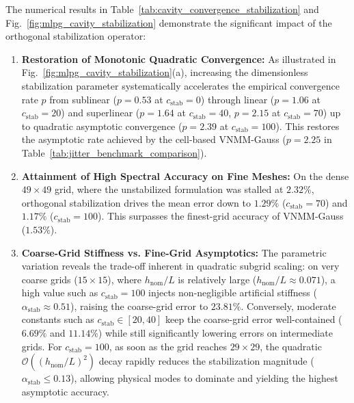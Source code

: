 \documentclass[preprint,12pt]{elsarticle}
\begin{document}
The numerical results in Table~\ref{tab:cavity_convergence_stabilization} and Fig.~\ref{fig:mlpg_cavity_stabilization} demonstrate the significant impact of the orthogonal stabilization operator:
\begin{enumerate}
    \item \textbf{Restoration of Monotonic Quadratic Convergence:} As illustrated in Fig.~\ref{fig:mlpg_cavity_stabilization}(a), increasing the dimensionless stabilization parameter systematically accelerates the empirical convergence rate $p$ from sublinear ($p = 0.53$ at $c_{\mathrm{stab}} = 0$) through linear ($p = 1.06$ at $c_{\mathrm{stab}} = 20$) and superlinear ($p = 1.64$ at $c_{\mathrm{stab}} = 40$, $p = 2.15$ at $c_{\mathrm{stab}} = 70$) up to quadratic asymptotic convergence ($p = 2.39$ at $c_{\mathrm{stab}} = 100$). This restores the asymptotic rate achieved by the cell-based VNMM-Gauss ($p = 2.25$ in Table~\ref{tab:jitter_benchmark_comparison}).
    \item \textbf{Attainment of High Spectral Accuracy on Fine Meshes:} On the dense $49 \times 49$ grid, where the unstabilized formulation was stalled at $2.32\%$, orthogonal stabilization drives the mean error down to $1.29\%$ ($c_{\mathrm{stab}} = 70$) and $\mathbf{1.17\%}$ ($c_{\mathrm{stab}} = 100$). This surpasses the finest-grid accuracy of VNMM-Gauss ($1.53\%$).
    \item \textbf{Coarse-Grid Stiffness vs. Fine-Grid Asymptotics:} The parametric variation reveals the trade-off inherent in quadratic subgrid scaling: on very coarse grids ($15 \times 15$), where $h_{\mathrm{nom}}/L$ is relatively large ($h_{\mathrm{nom}}/L \approx 0.071$), a high value such as $c_{\mathrm{stab}} = 100$ injects non-negligible artificial stiffness ($\alpha_{\mathrm{stab}} \approx 0.51$), raising the coarse-grid error to $23.81\%$. Conversely, moderate constants such as $c_{\mathrm{stab}} \in [20, 40]$ keep the coarse-grid error well-contained ($6.69\%$ and $11.14\%$) while still significantly lowering errors on intermediate grids. For $c_{\mathrm{stab}} = 100$, as soon as the grid reaches $29 \times 29$, the quadratic $\mathcal{O}((h_{\mathrm{nom}}/L)^2)$ decay rapidly reduces the stabilization magnitude ($\alpha_{\mathrm{stab}} \le 0.13$), allowing physical modes to dominate and yielding the highest asymptotic accuracy.

\end{enumerate}
\end{document}
